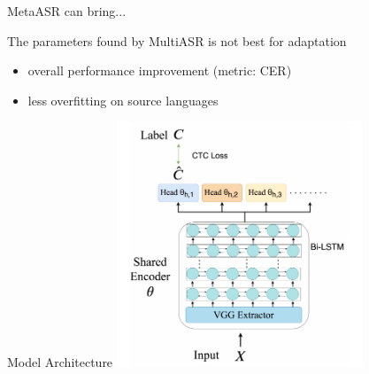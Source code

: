 \documentclass{beamer}
\begin{document}
\begin{frame}[t]{MetaASR can bring...}
  \begin{center}
  The parameters found by MultiASR is not best for adaptation
  \end{center}

  \begin{itemize}
    \item overall performance improvement (metric: CER)
    \item less overfitting on source languages
  \end{itemize}
  \flushright \hyperlink{another example}{}
\end{frame}


\begin{frame}[t]{Model Architecture}
  \center \includegraphics[width=0.55\textwidth]{fig/model_arch.png}
\end{frame}



\end{document}
